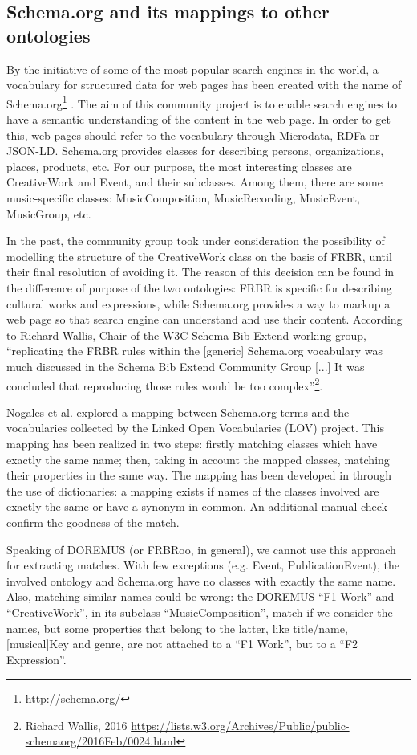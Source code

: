 \documentclass{llncs}
\begin{document}
\subsection{Schema.org and its mappings to other ontologies}
By the initiative of some of the most popular search engines in the world, a vocabulary for structured data for web pages has been created with the name of Schema.org\footnote{\url{http://schema.org/}} \cite{guha2015schema}. The aim of this community project is to enable search engines to have a semantic understanding of the content in the web page. In order to get this, web pages should refer to the vocabulary through Microdata, RDFa or JSON-LD. Schema.org provides classes for describing persons, organizations, places, products, etc. For our purpose, the most interesting classes are CreativeWork and Event, and their subclasses. Among them, there are some music-specific classes: MusicComposition, MusicRecording, MusicEvent, MusicGroup, etc.

In the past, the community group took under consideration the possibility of modelling the structure of the CreativeWork class on the basis of FRBR, until their final resolution of avoiding it. The reason of this decision can be found in the difference of purpose of the two ontologies: FRBR is specific for describing cultural works and expressions, while Schema.org provides a way to markup a web page so that search engine can understand and use their content. According to Richard Wallis, Chair of the W3C Schema Bib Extend working group, ``replicating the FRBR rules within the [generic] Schema.org vocabulary was much discussed in the Schema Bib Extend Community Group [...] It was concluded that reproducing those rules would be too complex''\footnote{Richard Wallis, 2016 \url{https://lists.w3.org/Archives/Public/public-schemaorg/2016Feb/0024.html}}.

Nogales et al. \cite{nogales2013exploring} explored a mapping between Schema.org terms and the vocabularies collected by the Linked Open Vocabularies (LOV) project. This mapping has been realized in two steps: firstly matching classes which have exactly the same name; then, taking in account the mapped classes, matching their properties in the same way. The mapping has been developed in \cite{nogales2016linking} through the use of dictionaries: a mapping exists if names of the classes involved are exactly the same or have a synonym in common. An additional manual check confirm the goodness of the match.

Speaking of DOREMUS (or FRBRoo, in general), we cannot use this approach for extracting matches. With few exceptions (e.g. Event, PublicationEvent), the involved ontology and Schema.org have no classes with exactly the same name. Also, matching similar names could be wrong: the DOREMUS ``F1 Work'' and ``CreativeWork'', in its subclass ``MusicComposition'', match if we consider the names, but some properties that belong to the latter, like title/name, [musical]Key and genre, are not attached to a ``F1 Work'', but to a ``F2 Expression''.
\end{document}
